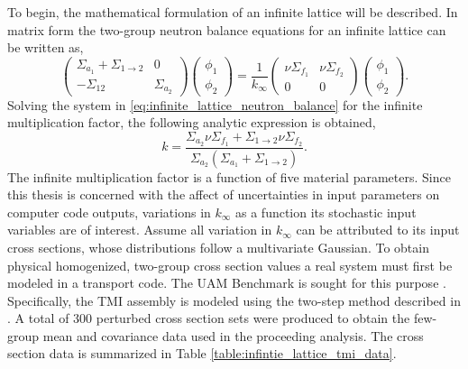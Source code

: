 To begin, the mathematical formulation of an infinite lattice will be described. In matrix form the two-group neutron balance equations for an infinite lattice can be written as,
\begin{equation}
\label{eq:infinite_lattice_neutron_balance}
   \left(
    \begin{array}{cc}
     \Sigma_{a_1} + \Sigma_{1\rightarrow 2} & 0 \\
     -\Sigma_{12} & \Sigma_{a_2} 
    \end{array}
   \right)
   \left(
    \begin{array}{c}
     \phi_1 \\
     \phi_2
    \end{array}
   \right) 
   = \frac{1}{k_{\infty}}
   \left(
    \begin{array}{cc}
     \nu\Sigma_{f_1} & \nu\Sigma_{f_2} \\
     0 & 0 
    \end{array}
   \right)
   \left(
    \begin{array}{c}
     \phi_1 \\
     \phi_2
    \end{array}
   \right). 
\end{equation}  
Solving the system in \ref{eq:infinite_lattice_neutron_balance} for the infinite multiplication factor, the following analytic expression is obtained,
\begin{equation}
\label{eq:infinite_lattice_kinf}
   k = \frac{\Sigma_{a_2}\nu\Sigma_{f_1} + 
             \Sigma_{1\rightarrow 2}\nu\Sigma_{f_2}}{
              \Sigma_{a_2}\left(
               \Sigma_{a_1} + \Sigma_{1\rightarrow 2}\right)}.
\end{equation}
The infinite multiplication factor is a function of five material parameters. Since this thesis is concerned with the affect of uncertainties in input parameters on computer code outputs, variations in $k_{\infty}$ as a function its stochastic input variables are of interest. Assume all variation in $k_{\infty}$ can be attributed to its input cross sections, whose distributions follow a multivariate Gaussian. To obtain physical homogenized, two-group cross section values a real system must first be modeled in a transport code. The \ac{UAM} Benchmark is sought for this purpose \cite{UAM_Benchmark}. Specifically, the \ac{TMI} assembly is modeled using the two-step method described in \cite{TwoStep_Approach}. A total of 300 perturbed cross section sets were produced to obtain the few-group mean and covariance data used in the proceeding analysis. The cross section data is summarized in Table \ref{table:infintie_lattice_tmi_data}.      
